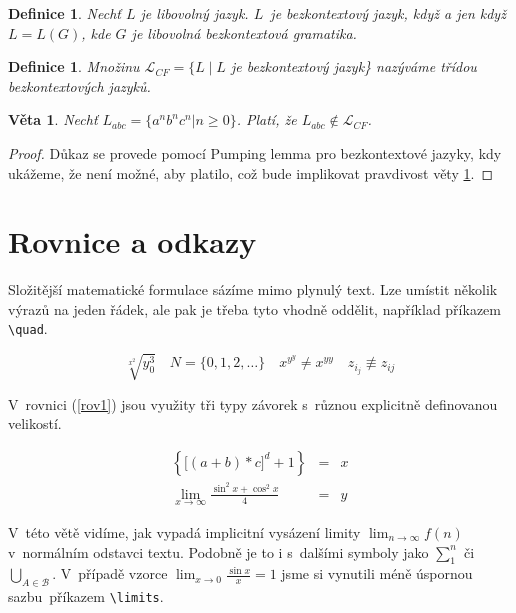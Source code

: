 \documentclass[a4paper,11pt]{article}
\newtheorem{definice}[subsection]{Definice}
\newtheorem{veta}{Věta}
\begin{document}
	\setcounter{subsection}{3}
	\begin{definice}
		{\textup{Nechť $L$ je libovolný jazyk. $L$~je} bezkontextový jazyk, 
			\textup{když a jen když $L=L(G)$, kde $G$ je libovolná bezkontextová gramatika.}}
	\end{definice}
	
	\begin{definice}
		\textup{Množinu $\mathcal{L}_{CF}=\{L\!\mid\! L$ je bezkontextový jazyk\}
			nazýváme \emph{třídou bezkontextových jazyků.}}
	\end{definice}
	
	\begin{veta}
		\label{veta1}
		Nechť $L_{abc}=\{a^nb^nc^n|n\geq 0\}$. Platí, že $L_{abc}\not\in\mathcal{L}_{CF}$.
	\end{veta}
	
	\begin{proof}
		Důkaz se provede pomocí Pumping lemma pro bezkontextové jazyky, kdy ukážeme, 
		že není možné, aby platilo, což bude implikovat pravdivost věty \ref{veta1}.
	\end{proof}

	\section{Rovnice a odkazy}
	
	Složitější matematické formulace sázíme mimo plynulý text. 
	Lze umístit několik výrazů na jeden řádek, ale pak je třeba tyto 
	vhodně oddělit, například příkazem \verb$\quad$.\par 
	
	$$\sqrt[x^2]{y_0^3}\quad{N} =\{0,1,2,\ldots\}\quad x^{y^y}\neq x^{yy}
	\quad z_{i_j}\not\equiv z_{ij}$$
	
	V~rovnici (\ref{rov1}) jsou využity tři typy závorek s~různou 
	explicitně definovanou velikostí.\par
	
	\setcounter{equation}{0}
	\begin{eqnarray}
	\label{rov1}
	\left\{\Big[\left(a+b\right)*c\Big]^d+1\right\}&=&x\\
	\lim_{x \rightarrow\infty}\frac{\sin^2x+\cos^2x}{4}&=&y \nonumber
	\end{eqnarray}
	
	
	
	V~této větě vidíme, jak vypadá implicitní vysázení limity 
	$\lim_{n\rightarrow\infty} f(n)$ v~normálním odstavci textu. 
	Podobně je to i s~dalšími symboly jako $\sum_{1}^n$ či $\bigcup_{A\in \mathcal{B}}$. V~případě vzorce $\displaystyle\lim_{x\rightarrow 0}$$\frac{\sin x}{x}=1$ 
	jsme si vynutili méně úspornou sazbu~příkazem \verb$\limits$.\par
	
\end{document}
